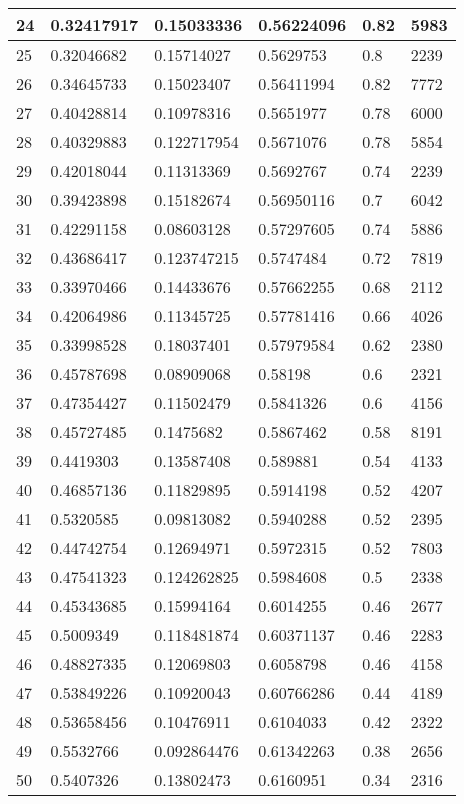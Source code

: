 \begin{longtable}{|l|l|l|l|l|l|}
24 & 0.32417917 & 0.15033336 & 0.56224096 & 0.82 & 5983 \\ \hline 
25 & 0.32046682 & 0.15714027 & 0.5629753 & 0.8 & 2239 \\ \hline 
26 & 0.34645733 & 0.15023407 & 0.56411994 & 0.82 & 7772 \\ \hline 
27 & 0.40428814 & 0.10978316 & 0.5651977 & 0.78 & 6000 \\ \hline 
28 & 0.40329883 & 0.122717954 & 0.5671076 & 0.78 & 5854 \\ \hline 
29 & 0.42018044 & 0.11313369 & 0.5692767 & 0.74 & 2239 \\ \hline 
30 & 0.39423898 & 0.15182674 & 0.56950116 & 0.7 & 6042 \\ \hline 
31 & 0.42291158 & 0.08603128 & 0.57297605 & 0.74 & 5886 \\ \hline 
32 & 0.43686417 & 0.123747215 & 0.5747484 & 0.72 & 7819 \\ \hline 
33 & 0.33970466 & 0.14433676 & 0.57662255 & 0.68 & 2112 \\ \hline 
34 & 0.42064986 & 0.11345725 & 0.57781416 & 0.66 & 4026 \\ \hline 
35 & 0.33998528 & 0.18037401 & 0.57979584 & 0.62 & 2380 \\ \hline 
36 & 0.45787698 & 0.08909068 & 0.58198 & 0.6 & 2321 \\ \hline 
37 & 0.47354427 & 0.11502479 & 0.5841326 & 0.6 & 4156 \\ \hline 
38 & 0.45727485 & 0.1475682 & 0.5867462 & 0.58 & 8191 \\ \hline 
39 & 0.4419303 & 0.13587408 & 0.589881 & 0.54 & 4133 \\ \hline 
40 & 0.46857136 & 0.11829895 & 0.5914198 & 0.52 & 4207 \\ \hline 
41 & 0.5320585 & 0.09813082 & 0.5940288 & 0.52 & 2395 \\ \hline 
42 & 0.44742754 & 0.12694971 & 0.5972315 & 0.52 & 7803 \\ \hline 
43 & 0.47541323 & 0.124262825 & 0.5984608 & 0.5 & 2338 \\ \hline 
44 & 0.45343685 & 0.15994164 & 0.6014255 & 0.46 & 2677 \\ \hline 
45 & 0.5009349 & 0.118481874 & 0.60371137 & 0.46 & 2283 \\ \hline 
46 & 0.48827335 & 0.12069803 & 0.6058798 & 0.46 & 4158 \\ \hline 
47 & 0.53849226 & 0.10920043 & 0.60766286 & 0.44 & 4189 \\ \hline 
48 & 0.53658456 & 0.10476911 & 0.6104033 & 0.42 & 2322 \\ \hline 
49 & 0.5532766 & 0.092864476 & 0.61342263 & 0.38 & 2656 \\ \hline 
50 & 0.5407326 & 0.13802473 & 0.6160951 & 0.34 & 2316 \\ \hline 
\end{longtable}